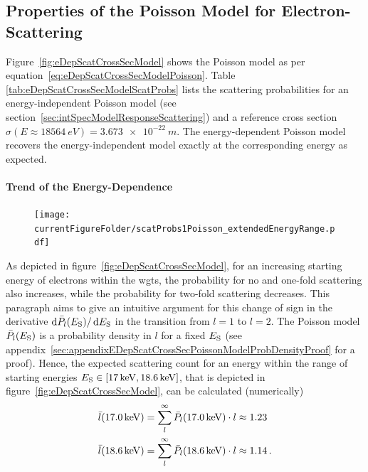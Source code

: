 \subsection{Properties of the Poisson Model for Electron-Scattering}
\label{sec:eDepScatCrossSecModelPoissonProperties}
Figure~\ref{fig:eDepScatCrossSecModel} shows the Poisson model as per equation~\eqref{eq:eDepScatCrossSecModelPoisson}. Table \ref{tab:eDepScatCrossSecModelScatProbs} lists the scattering probabilities for an energy-independent Poisson model (see section~\ref{sec:intSpecModelResponseScattering}) and a reference cross section $\sigma(E\approx\SI{18564}{eV})=\SI{3.673e-22}{m}$. The energy-dependent Poisson model recovers the energy-independent model exactly at the corresponding energy as expected.

\paragraph{Trend of the Energy-Dependence}
\begin{figure}[th]
	\texttt{[image: \\currentFigureFolder/scatProbs1Poisson\_extendedEnergyRange.pdf]}
	\label{fig:eDepScatCrossSecModelPoissonP1ExtendedEnergyRange}
\end{figure}
As depicted in figure~\ref{fig:eDepScatCrossSecModel}, for an increasing starting energy of electrons within the \gls{wgts}, the probability for no and one-fold scattering also increases, while the probability for two-fold scattering decreases. This paragraph aims to give an intuitive argument for this change of sign in the derivative $\mathop{}\!\mathrm{d} \bar{P}_l(E_\mathrm{S}) / \mathop{}\!\mathrm{d} E_\mathrm{S}$ in the transition from $l=1$ to $l=2$. The Poisson model $\bar{P}_l(E_\mathrm{S})$ is a probability density in $l$ for a fixed $E_\mathrm{S}$ (see appendix~\ref{sec:appendixEDepScatCrossSecPoissonModelProbDensityProof} for a proof). Hence, the expected scattering count for an energy within the range of starting energies $E_\mathrm{S} \in [\SI{17}{keV}, \SI{18.6}{keV}]$, that is depicted in figure~\ref{fig:eDepScatCrossSecModel}, can be calculated (numerically)
\begin{equation}
\label{eq:eDepScatCrossSecModelPoissonExpectedScatCount}
\begin{split}	
	\bar{l}(\SI{17.0}{keV}) &= 
	\sum_{l}^{\infty} \bar{P}_l(\SI{17.0}{keV}) \cdot l \approx 1.23 \\	
	\bar{l}(\SI{18.6}{keV}) &= 
	\sum_{l}^{\infty} \bar{P}_l(\SI{18.6}{keV}) \cdot l \approx 1.14
	\text{\,.}
\end{split}
\end{equation} 
